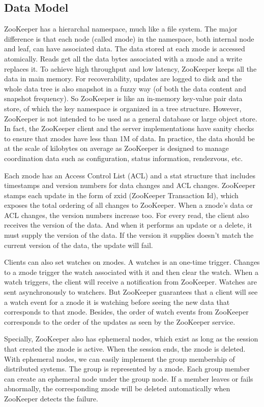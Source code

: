 \documentclass[12pt]{book}
\begin{document}
\subsection{Data Model}
ZooKeeper has a hierarchal namespace, much like a file system. The major difference is that each node (called znode) in the namespace, both internal node and leaf, can have associated data. The data stored at each znode is accessed atomically. Reads get all the data bytes associated with a znode and a write replaces it. To achieve high throughput and low latency, ZooKeeper keeps all the data in main memory. For recoverability, updates are logged to disk and the whole data tree is also snapshot in a fuzzy way (of both the data content and snapshot frequency). So ZooKeeper is like an in-memory key-value pair data store, of which the key namespace is organized in a tree structure. However, ZooKeeper is not intended to be used as a general database or large object store. In fact, the ZooKeeper client and the server implementations have sanity checks to ensure that znodes have less than 1M of data. In practice, the data should be at the scale of kilobytes on average as ZooKeeper is designed to manage coordination data such as configuration, status information, rendezvous, etc. 

Each znode has an Access Control List (ACL) and a stat structure that includes timestamps and version numbers for data changes and ACL changes. ZooKeeper stamps each update in the form of zxid (ZooKeeper Transaction Id), which exposes the total ordering of all changes to ZooKeeper. When a znode's data or ACL changes, the version numbers increase too. For every read, the client also receives the version of the data. And when it performs an update or a delete, it must supply the version of the data. If the version it supplies doesn't match the current version of the data, the update will fail.

Clients can also set watches on znodes. A watches is an one-time trigger. Changes to a znode trigger the watch associated with it and then clear the watch. When a watch triggers, the client will receive a notification from ZooKeeper. Watches are sent asynchronously to watchers. But ZooKeeper guarantees that a client will see a watch event for a znode it is watching before seeing the new data that corresponds to that znode. Besides, the order of watch events from ZooKeeper corresponds to the order of the updates as seen by the ZooKeeper service.

Specially, ZooKeeper also has ephemeral nodes, which exist as long as the session that created the znode is active. When the session ends, the znode is deleted. With ephemeral nodes, we can easily implement the group membership of distributed systems. The group is represented by a znode. Each group member can create an ephemeral node under the group node. If a member leaves or fails abnormally, the corresponding znode will be deleted automatically when ZooKeeper detects the failure.
\end{document}
